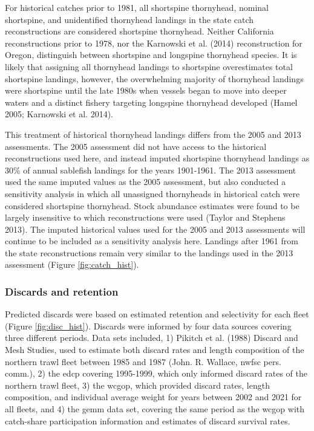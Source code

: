 \documentclass[11pt,
  english,
  letterpaper,
]{article}
\begin{document}
For historical catches prior to 1981, all shortspine thornyhead, nominal shortspine, and unidentified thornyhead landings in the state catch reconstructions are considered shortspine thornyhead. Neither California reconstructions prior to 1978, nor the Karnowski et al. (2014) reconstruction for Oregon, distinguish between shortspine and longspine thornyhead species. It is likely that assigning all thornyhead landings to shortspine overestimates total shortspine landings, however, the overwhelming majority of thornyhead landings were shortspine until the late 1980s when vessels began to move into deeper waters and a distinct fishery targeting longspine thornyhead developed (Hamel 2005; Karnowski et al. 2014).

This treatment of historical thornyhead landings differs from the 2005 and 2013 assessments. The 2005 assessment did not have access to the historical reconstructions used here, and instead imputed shortspine thornyhead landings as 30\% of annual sablefish landings for the years 1901-1961. The 2013 assessment used the same imputed values as the 2005 assessment, but also conducted a sensitivity analysis in which all unassigned thornyheads in historical catch were considered shortspine thornyhead. Stock abundance estimates were found to be largely insensitive to which reconstructions were used (Taylor and Stephens 2013). The imputed historical values used for the 2005 and 2013 assessments will continue to be included as a sensitivity analysis here. Landings after 1961 from the state reconstructions remain very similar to the landings used in the 2013 assessment (Figure \ref{fig:catch_hist}).

\hypertarget{discards-and-retention}{%
\subsubsection{Discards and retention}\label{discards-and-retention}}

Predicted discards were based on estimated retention and selectivity for each fleet (Figure \ref{fig:disc_hist}). Discards were informed by four data sources covering three different periods. Data sets included, 1) Pikitch et al. (1988) Discard and Mesh Studies, used to estimate both discard rates and length composition of the northern trawl fleet between 1985 and 1987 (John. R. Wallace, \gls{nwfsc} pers. comm.), 2) the \gls{edcp} covering 1995-1999, which only informed discard rates of the northern trawl fleet, 3) the \gls{wcgop}, which provided discard rates, length composition, and individual average weight for years between 2002 and 2021 for all fleets, and 4) the \gls{gemm} data set, covering the same period as the \gls{wcgop} with catch-share participation information and estimates of discard survival rates.
\end{document}
